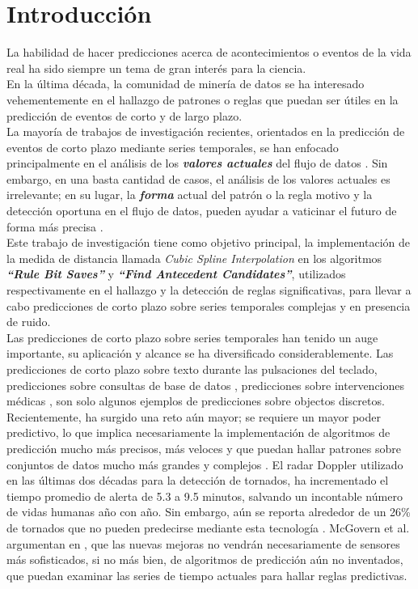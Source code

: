 \section{\textbf{Introducci\'on}}
La habilidad de hacer predicciones acerca de acontecimientos o eventos de la vida real ha sido siempre un tema de gran inter\'es para la ciencia.\\ 
En la \'ultima d\'ecada, la comunidad de miner\'ia de datos se ha interesado vehementemente en el hallazgo de patrones o reglas que puedan ser \'utiles en la predicci\'on de eventos de corto y de largo plazo.\\
La mayor\'ia de trabajos de investigaci\'on recientes, orientados en la predicci\'on de eventos de corto plazo mediante series temporales, se han enfocado principalmente en el an\'alisis de los \textit{\textbf{valores actuales}} del flujo de datos \cite{rulediscovery}\cite{subsequencematching}. Sin embargo, en una basta cantidad de casos, el an\'alisis de los valores actuales es irrelevante; en su lugar, la \textit{\textbf{forma}} actual del patr\'on o la regla motivo y la detecci\'on oportuna en el flujo de datos, pueden ayudar a vaticinar el futuro de forma m\'as precisa \cite{main}.\\
Este trabajo de investigaci\'on tiene como objetivo principal, la implementaci\'on de la medida de distancia llamada \textit{Cubic Spline Interpolation} en los algoritmos \textit{\textbf{\enquote{Rule Bit Saves}}} y \textit{\textbf{\enquote{Find Antecedent Candidates}}}, utilizados respectivamente en el hallazgo y la detecci\'on de reglas significativas, para llevar a cabo predicciones de corto plazo sobre series temporales complejas y en presencia de ruido.\\
Las predicciones de corto plazo sobre series temporales han tenido un auge importante, su aplicaci\'on y alcance se ha diversificado considerablemente. Las predicciones de corto plazo sobre texto durante las pulsaciones del teclado, predicciones sobre consultas de base de datos \cite{type}, predicciones sobre intervenciones m\'edicas \cite{medical}, son solo algunos ejemplos de predicciones sobre objectos discretos.\\
Recientemente, ha surgido una reto a\'un mayor; se requiere un mayor poder predictivo, lo que implica necesariamente la implementaci\'on de algoritmos de predicci\'on mucho m\'as precisos, m\'as veloces y que puedan hallar patrones sobre conjuntos de datos mucho m\'as grandes y complejos \cite{robotics}. El radar Doppler utilizado en las \'ultimas dos d\'ecadas para la detecci\'on de tornados, ha incrementado el tiempo promedio de alerta de 5.3 a 9.5 minutos, salvando un incontable n\'umero de vidas humanas a\~no con a\~no. Sin embargo, a\'un se reporta alrededor de un 26\% de tornados que no pueden predecirse mediante esta tecnolog\'ia \cite{weatherforcasting}. McGovern et al. argumentan en \cite{weatherprediction}, que las nuevas mejoras no vendr\'an necesariamente de sensores m\'as sofisticados, si no m\'as bien, de algoritmos de predicci\'on a\'un no inventados, que puedan examinar las series de tiempo actuales para hallar reglas predictivas.\\
